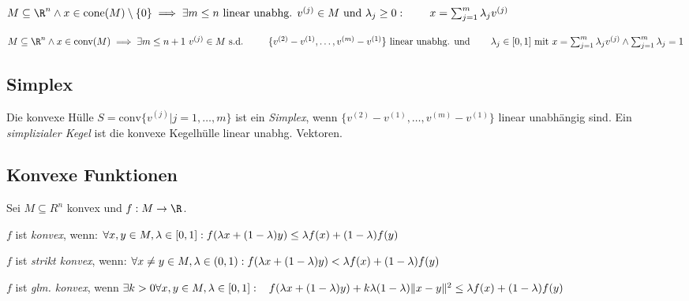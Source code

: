 \(M \subseteq \R^n \land x \in \text{cone}(M) \setminus \{0\} \\ \implies \exists m \leq n \text{ linear unabhg. } v^{(j)} \in M \text{ und } \lambda_j \geq 0 : \\ \phantom{\implies} x = \sum_{j=1}^m \lambda_j v^{(j)}\)

\spacing

\(M \subseteq \R^n \land x \in \text{conv}(M) \\ \implies \exists m \leq n+1 \ v^{(j)} \in M \text{ s.d. } \\ \phantom{\implies} \{v^{(2)} - v^{(1)},\dots,v^{(m)}-v^{(1)}\} \text{ linear unabhg. und} \\ \phantom{\implies} \lambda_j \in [0,1] \text{ mit } x = \sum_{j=1}^m \lambda_j v^{(j)} \land \sum_{j=1}^m \lambda_j = 1\)

\subsection*{Simplex}

Die konvexe Hülle \(S = \text{conv}\{v^{(j)} | j=1,\dots,m\}\) ist ein \emph{Simplex}, wenn \(\{v^{(2)} - v^{(1)},\dots,v^{(m)}-v^{(1)}\}\) linear unabhängig sind. Ein \emph{simplizialer Kegel} ist die konvexe Kegelhülle linear unabhg. Vektoren.

\subsection*{Konvexe Funktionen}

Sei \(M \subseteq R^n\) konvex und \(f : M \to \R\).

\spacing

\(f\) ist \emph{konvex}, wenn: \(\forall x, y \in M, \lambda \in [0,1] : \\ f(\lambda x + (1-\lambda)y) \leq \lambda f(x) + (1-\lambda)f(y)\)

\spacing

\(f\) ist \emph{strikt konvex}, wenn: \(\forall x \neq y \in M, \lambda \in (0,1) : \\ f(\lambda x + (1-\lambda)y) < \lambda f(x) + (1-\lambda)f(y)\)

\spacing

\(f\) ist \emph{glm. konvex}, wenn \(\exists k > 0 \forall x, y \in M, \lambda \in [0,1] : \\ \hspace*{3mm} f(\lambda x + (1-\lambda)y) + k\lambda(1-\lambda)\|x-y\|^2 \\ \leq \lambda f(x) + (1-\lambda)f(y)\)

